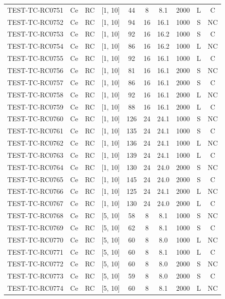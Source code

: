 \begin{longtable}{lccccccccc}
TEST-TC-RC0751 & Ce & RC & [1, 10] & 44 & 8 & 8.1 & 2000 & L & C \\
TEST-TC-RC0752 & Ce & RC & [1, 10] & 94 & 16 & 16.1 & 1000 & S & NC \\
TEST-TC-RC0753 & Ce & RC & [1, 10] & 92 & 16 & 16.2 & 1000 & S & C \\
TEST-TC-RC0754 & Ce & RC & [1, 10] & 86 & 16 & 16.2 & 1000 & L & NC \\
TEST-TC-RC0755 & Ce & RC & [1, 10] & 92 & 16 & 16.1 & 1000 & L & C \\
TEST-TC-RC0756 & Ce & RC & [1, 10] & 81 & 16 & 16.1 & 2000 & S & NC \\
TEST-TC-RC0757 & Ce & RC & [1, 10] & 86 & 16 & 16.1 & 2000 & S & C \\
TEST-TC-RC0758 & Ce & RC & [1, 10] & 92 & 16 & 16.1 & 2000 & L & NC \\
TEST-TC-RC0759 & Ce & RC & [1, 10] & 88 & 16 & 16.1 & 2000 & L & C \\
TEST-TC-RC0760 & Ce & RC & [1, 10] & 126 & 24 & 24.1 & 1000 & S & NC \\
TEST-TC-RC0761 & Ce & RC & [1, 10] & 135 & 24 & 24.1 & 1000 & S & C \\
TEST-TC-RC0762 & Ce & RC & [1, 10] & 136 & 24 & 24.1 & 1000 & L & NC \\
TEST-TC-RC0763 & Ce & RC & [1, 10] & 139 & 24 & 24.1 & 1000 & L & C \\
TEST-TC-RC0764 & Ce & RC & [1, 10] & 130 & 24 & 24.0 & 2000 & S & NC \\
TEST-TC-RC0765 & Ce & RC & [1, 10] & 145 & 24 & 24.0 & 2000 & S & C \\
TEST-TC-RC0766 & Ce & RC & [1, 10] & 125 & 24 & 24.1 & 2000 & L & NC \\
TEST-TC-RC0767 & Ce & RC & [1, 10] & 130 & 24 & 24.0 & 2000 & L & C \\
TEST-TC-RC0768 & Ce & RC & [5, 10] & 58 & 8 & 8.1 & 1000 & S & NC \\
TEST-TC-RC0769 & Ce & RC & [5, 10] & 62 & 8 & 8.1 & 1000 & S & C \\
TEST-TC-RC0770 & Ce & RC & [5, 10] & 60 & 8 & 8.0 & 1000 & L & NC \\
TEST-TC-RC0771 & Ce & RC & [5, 10] & 60 & 8 & 8.1 & 1000 & L & C \\
TEST-TC-RC0772 & Ce & RC & [5, 10] & 60 & 8 & 8.0 & 2000 & S & NC \\
TEST-TC-RC0773 & Ce & RC & [5, 10] & 59 & 8 & 8.0 & 2000 & S & C \\
TEST-TC-RC0774 & Ce & RC & [5, 10] & 60 & 8 & 8.1 & 2000 & L & NC \\

\end{longtable}
